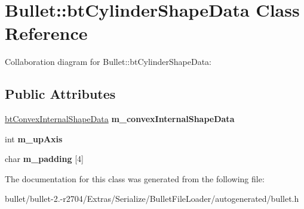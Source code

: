 \hypertarget{class_bullet_1_1bt_cylinder_shape_data}{\section{Bullet\+:\+:bt\+Cylinder\+Shape\+Data Class Reference}
\label{class_bullet_1_1bt_cylinder_shape_data}
}


Collaboration diagram for Bullet\+:\+:bt\+Cylinder\+Shape\+Data\+:
\subsection*{Public Attributes}
\begin{DoxyCompactItemize}
\item 
\hypertarget{class_bullet_1_1bt_cylinder_shape_data_a0b7946d928ac00b479ad946b45f17404}{\hyperlink{class_bullet_1_1bt_convex_internal_shape_data}{bt\+Convex\+Internal\+Shape\+Data} {\bfseries m\+\_\+convex\+Internal\+Shape\+Data}}\label{class_bullet_1_1bt_cylinder_shape_data_a0b7946d928ac00b479ad946b45f17404}

\item 
\hypertarget{class_bullet_1_1bt_cylinder_shape_data_a421783b7fb4db5f4d284c55e515e44dc}{int {\bfseries m\+\_\+up\+Axis}}\label{class_bullet_1_1bt_cylinder_shape_data_a421783b7fb4db5f4d284c55e515e44dc}

\item 
\hypertarget{class_bullet_1_1bt_cylinder_shape_data_ac72bebe2caf916c7165fef52b5399c4f}{char {\bfseries m\+\_\+padding} \mbox{[}4\mbox{]}}\label{class_bullet_1_1bt_cylinder_shape_data_ac72bebe2caf916c7165fef52b5399c4f}

\end{DoxyCompactItemize}


The documentation for this class was generated from the following file\+:\begin{DoxyCompactItemize}
\item 
bullet/bullet-\/2.-\/r2704/\+Extras/\+Serialize/\+Bullet\+File\+Loader/autogenerated/bullet.\+h\end{DoxyCompactItemize}
